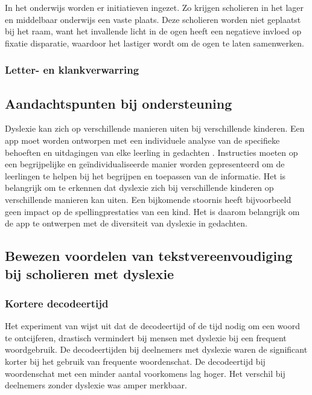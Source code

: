 In het onderwijs worden er initiatieven ingezet. Zo krijgen scholieren in het lager en middelbaar onderwijs een vaste plaats. Deze scholieren worden niet geplaatst bij het raam, want het invallende licht in de ogen heeft een negatieve invloed op fixatie disparatie, waardoor het lastiger wordt om de ogen te laten samenwerken. \autocite{Bezem2016}

\subsubsection{Letter- en klankverwarring}



\subsection{Aandachtspunten bij ondersteuning}

Dyslexie kan zich op verschillende manieren uiten bij verschillende kinderen. Een app moet worden ontworpen met een individuele analyse van de specifieke behoeften en uitdagingen van elke leerling in gedachten \autocite{Uhry2008, Gooding2018}. Instructies moeten op een begrijpelijke en geïndividualiseerde manier worden gepresenteerd om de leerlingen te helpen bij het begrijpen en toepassen van de informatie. Het is belangrijk om te erkennen dat dyslexie zich bij verschillende kinderen op verschillende manieren kan uiten. Een bijkomende stoornis heeft bijvoorbeeld geen impact op de spellingprestaties van een kind. Het is daarom belangrijk om de app te ontwerpen met de diversiteit van dyslexie in gedachten.

\subsection{Bewezen voordelen van tekstvereenvoudiging bij scholieren met dyslexie}

\subsubsection{Kortere decodeertijd}

Het experiment van \textcite{Rello2013} wijst uit dat de decodeertijd of de tijd nodig om een woord te ontcijferen, drastisch vermindert bij mensen met dyslexie bij een frequent woordgebruik. De decodeertijden bij deelnemers met dyslexie waren de significant korter bij het gebruik van frequente woordenschat. De decodeertijd bij woordenschat met een minder aantal voorkomens lag hoger. Het verschil bij deelnemers zonder dyslexie was amper merkbaar.

